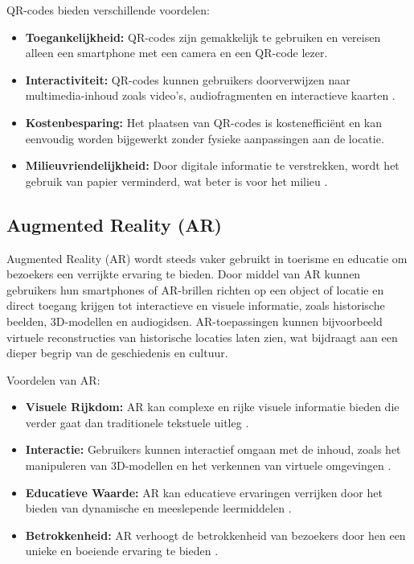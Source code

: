 QR-codes bieden verschillende voordelen:
\begin{itemize}
    \item \textbf{Toegankelijkheid:} QR-codes zijn gemakkelijk te gebruiken en vereisen alleen een smartphone met een camera en een QR-code lezer.
    \item \textbf{Interactiviteit:} QR-codes kunnen gebruikers doorverwijzen naar multimedia-inhoud zoals video's, audiofragmenten en interactieve kaarten \autocite{lin2013qr}.
    \item \textbf{Kostenbesparing:} Het plaatsen van QR-codes is kostenefficiënt en kan eenvoudig worden bijgewerkt zonder fysieke aanpassingen aan de locatie.
    \item \textbf{Milieuvriendelijkheid:} Door digitale informatie te verstrekken, wordt het gebruik van papier verminderd, wat beter is voor het milieu \autocite{neal2014implementing}.
\end{itemize}

\subsection{Augmented Reality (AR)}
Augmented Reality (AR) wordt steeds vaker gebruikt in toerisme en educatie om bezoekers een verrijkte ervaring te bieden. Door middel van AR kunnen gebruikers hun smartphones of AR-brillen richten op een object of locatie en direct toegang krijgen tot interactieve en visuele informatie, zoals historische beelden, 3D-modellen en audiogidsen. AR-toepassingen kunnen bijvoorbeeld virtuele reconstructies van historische locaties laten zien, wat bijdraagt aan een dieper begrip van de geschiedenis en cultuur.

Voordelen van AR:
\begin{itemize}
    \item \textbf{Visuele Rijkdom:} AR kan complexe en rijke visuele informatie bieden die verder gaat dan traditionele tekstuele uitleg \autocite{azuma1997survey}.
    \item \textbf{Interactie:} Gebruikers kunnen interactief omgaan met de inhoud, zoals het manipuleren van 3D-modellen en het verkennen van virtuele omgevingen \autocite{billinghurst2015towards}.
    \item \textbf{Educatieve Waarde:} AR kan educatieve ervaringen verrijken door het bieden van dynamische en meeslepende leermiddelen \autocite{wu2013current}.
    \item \textbf{Betrokkenheid:} AR verhoogt de betrokkenheid van bezoekers door hen een unieke en boeiende ervaring te bieden \autocite{tom2018exploring}.
\end{itemize}

